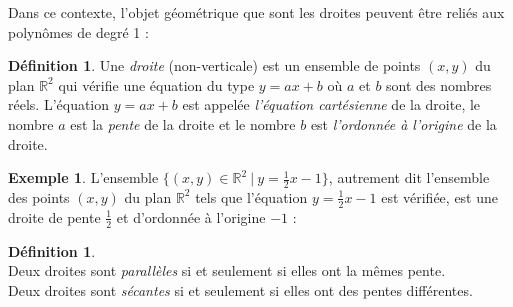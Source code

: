 \documentclass[a4paper,13pt]{scrreprt}
\theoremstyle{plain}
\theoremstyle{definition}
\newtheorem{déf}[subsection]{Définition}
\newtheorem{exe}[subsection]{Exemple}
\newcommand{\rr}{\mathbb{R}}
\begin{document}
Dans ce contexte, l'objet géométrique que sont les droites peuvent être reliés aux polynômes de degré 1 :
\begin{déf} \label{défdroite}
	Une \emph{droite} (non-verticale) est un ensemble de points $(x,y)$ du plan ${\rr}^2$ qui vérifie une équation du type $y = ax + b$ où $a$ et $b$ sont des nombres réels. L'équation $y = ax + b$ est appelée \emph{l'équation cartésienne} de la droite, le nombre $a$ est la \emph{pente} de la droite et le nombre $b$ est \emph{l'ordonnée à l'origine} de la droite.
\end{déf}
\begin{exe}
	L'ensemble $\{(x,y) \in {\rr}^2 ~|~ y = \frac{1}{2}x -1\}$, autrement dit l'ensemble des points $(x,y)$ du plan ${\rr}^2$ tels que l'équation $y=\frac{1}{2}x -1$ est vérifiée, est une droite de pente $\frac{1}{2}$ et d'ordonnée à l'origine $-1$ :
\begin{center}
\end{center}
\end{exe}
\begin{déf}
	~~\\
	Deux droites sont \emph{parallèles} si et seulement si elles ont la mêmes pente. \\
	Deux droites sont \emph{sécantes} si et seulement si elles ont des pentes différentes.
\end{déf}
\end{document}
